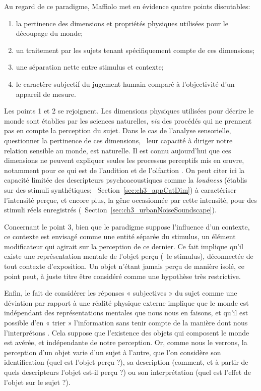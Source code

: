 Au regard de ce paradigme, Maffiolo met en évidence quatre points discutables:

\begin{enumerate}
\item la pertinence des dimensions et propriétés physiques utilisées pour le découpage du monde; 
\item un traitement par les sujets tenant spécifiquement compte de ces dimensions;
\item une séparation nette entre stimulus et contexte;
\item le caractère subjectif du jugement humain comparé à l'objectivité d'un appareil de mesure.
\end{enumerate}


Les points 1 et 2 se rejoignent. Les dimensions physiques utilisées pour décrire le monde sont établies par les sciences naturelles, \emph{via} des procédés qui ne prennent pas en compte la perception du sujet. Dans le cas de l'analyse sensorielle, questionner la pertinence de ces dimensions,  \ie~leur capacité à diriger notre relation sensible au monde, est naturelle. Il est connu aujourd'hui que ces dimensions ne peuvent expliquer seules les processus perceptifs mis en œuvre, notamment pour ce qui est de l'audition et de l'olfaction \citep{dubois2000categories}. On peut citer ici la capacité limitée des descripteurs psychoacoustiques comme la \emph{loudness} (établis sur des stimuli synthétiques; \cf~Section~\ref{sec:ch3_appCatDim}) à caractériser l'intensité perçue, et encore plus, la gêne occasionnée par cette intensité, pour des stimuli réels enregistrés (\cf~Section~\ref{sec:ch3_urbanNoiseSoundscape}). 

Concernant le point 3, bien que le paradigme suppose l'influence d'un contexte, ce contexte est envisagé comme une entité séparée du stimulus, un élément modificateur qui agirait sur la perception de ce dernier. Ce fait implique qu'il existe une représentation mentale de l'objet perçu (\ie~le stimulus), déconnectée de tout contexte d'exposition. Un objet n'étant jamais perçu de manière isolé, ce point peut, à juste titre  être considéré comme une hypothèse très restrictive.

Enfin, le fait de considérer les réponses « subjectives » du sujet comme une déviation par rapport à une réalité physique externe implique que le monde  est indépendant des représentations mentales que nous nous en faisons, et qu'il est possible d'en « trier » l'information sans tenir compte de la manière dont nous l'interprétons \citep{dubois2000categories}. Cela suppose que l'existence des objets qui composent le monde est avérée, et indépendante de notre perception. Or, comme nous le verrons, la perception d'un objet varie d'un sujet à l'autre, que l'on considère son identification (quel est l'objet perçu ?), sa description (comment, et à partir de quels descripteurs l'objet est-il perçu ?) ou son interprétation (quel est l'effet de l'objet sur le sujet ?). 

